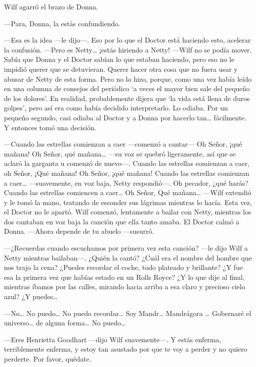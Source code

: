 Wilf agarró el brazo de Donna.

---Para, Donna, la estás confundiendo.

---Esa es la idea ---le dijo---. Eso por lo que el Doctor está haciendo
esto, acelerar la confusión. ---Pero es Netty\ldots{} ¡estás hiriendo a
Netty! ---Wilf no se podía mover. Sabía que Donna y el Doctor sabían lo
que estaban haciendo, pero eso no le impidió querer que se detuvieran.
Querer hacer otra cosa que no fuera usar y abusar de Netty de esta
forma. Pero no lo hizo, porque, como una vez había leído en una columna
de consejos del periódico `a veces el mayor bien sale del pequeño de los
dolores'. En realidad, probablemente dijera que `la vida está llena de
duros golpes', pero así era como había decidido interpretarlo. Lo
odiaba. Por un pequeño segundo, casi odiaba al Doctor y a Donna por
hacerlo tan\ldots{} fácilmente. Y entonces tomó una decisión.

---Cuando las estrellas comienzan a caer ---comenzó a cantar--- Oh
Señor, ¡qué mañana! Oh Señor, qué mañana\ldots{} ---su voz se quebró
ligeramente, así que se aclaró la garganta u comenzó de nuevo---. Cuando
las estrellas comienzan a caer, oh Señor, ¡Qué mañana! Oh Señor, ¡qué
mañana! Cuando las estrellas comienzan a caer\ldots{} ---suavemente, en
voz baja, Netty respondió---. Oh pecador, ¿qué harás? Cuando las
estrellas comiencen a caer\ldots{} Oh Señor, Qué mañana\ldots{} ---Wilf
extendió y le tomó la mano, tratando de esconder sus lágrimas mientras
lo hacía. Esta vez, el Doctor no le apartó. Wilf comenzó, lentamente a
bailar con Netty, mientras los dos cantaban en voz baja la canción que
ella tanto amaba. El Doctor calmó a Donna. ---Ahora depende de tu abuelo
---susurró.

---¿Recuerdas cuando escuchamos por primera vez esta canción? ---le dijo
Wilf a Netty mientras bailaban---. ¿Quién la cantó? ¿Cuál era el nombre
del hombre que nos trajo la cena? ¿Puedes recordar el coche, todo
plateado y brillante? ¿Y fue esa la primera vez que habías estado en un
Rolls Royce? ¿Y lo que dije al final, mientras íbamos por las calles,
mirando hacia arriba a esa claro y precioso cielo azul? ¿Y
puedes\ldots{}

---No\ldots{} No puedo\ldots{} No puedo recordar\ldots{} Soy
Mandr\ldots{} Mandrágora \ldots{} Gobernaré el universo\ldots{} de
alguna forma\ldots{} No puedo\ldots{}

---Eres Henrietta Goodhart ---dijo Wilf suavemente---. Y estás enferma,
terriblemente enferma, y estoy tan asustado por que te voy a perder y no
quiero perderte. Por favor, quédate.

